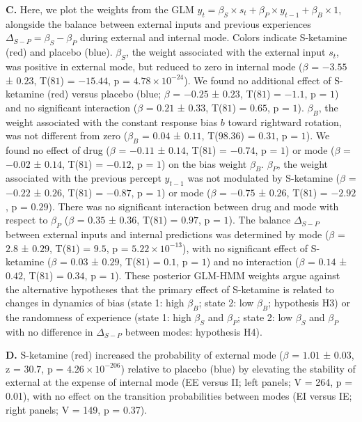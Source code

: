 \documentclass[
]{article}
\begin{document}
\textbf{C.} Here, we plot the weights from the GLM
\(y_t = \beta_S \times s_t + \beta_P \times y_{t-1} + \beta_B \times 1\),
alongside the balance between external inputs and previous experiences
\(\Delta_{S-P} = \beta_S - \beta_P\) during external and internal mode.
Colors indicate S-ketamine (red) and placebo (blue). \(\beta_S\), the
weight associated with the external input \(s_t\), was positive in
external mode, but reduced to zero in internal mode (\(\beta\) =
\(-3.55\) ± \(0.23\), T(\(81\)) = \(-15.44\), p =
\(\ensuremath{4.78\times 10^{-24}}\)). We found no additional effect of
S-ketamine (red) versus placebo (blue; \(\beta\) = \(-0.25\) ± \(0.23\),
T(\(81\)) = \(-1.1\), p = \(1\)) and no significant interaction
(\(\beta\) = \(0.21\) ± \(0.33\), T(\(81\)) = \(0.65\), p = \(1\)).
\(\beta_B\), the weight associated with the constant response bias \(b\)
toward rightward rotation, was not different from zero (\(\beta_B\) =
\(0.04\) ± \(0.11\), T(\(98.36\)) = \(0.31\), p = \(1\)). We found no
effect of drug (\(\beta\) = \(-0.11\) ± \(0.14\), T(\(81\)) = \(-0.74\),
p = \(1\)) or mode (\(\beta\) = \(-0.02\) ± \(0.14\), T(\(81\)) =
\(-0.12\), p = \(1\)) on the bias weight \(\beta_B\). \(\beta_P\), the
weight associated with the previous percept \(y_{t-1}\) was not
modulated by S-ketamine (\(\beta\) = \(-0.22\) ± \(0.26\), T(\(81\)) =
\(-0.87\), p = \(1\)) or mode (\(\beta\) = \(-0.75\) ± \(0.26\),
T(\(81\)) = \(-2.92\), p = \(0.29\)). There was no significant
interaction between drug and mode with respect to \(\beta_P\) (\(\beta\)
= \(0.35\) ± \(0.36\), T(\(81\)) = \(0.97\), p = \(1\)). The balance
\(\Delta_{S-P}\) between external inputs and internal predictions was
determined by mode (\(\beta\) = \(2.8\) ± \(0.29\), T(\(81\)) = \(9.5\),
p = \(\ensuremath{5.22\times 10^{-13}}\)), with no significant effect of
S-ketamine (\(\beta\) = \(0.03\) ± \(0.29\), T(\(81\)) = \(0.1\), p =
\(1\)) and no interaction (\(\beta\) = \(0.14\) ± \(0.42\), T(\(81\)) =
\(0.34\), p = \(1\)). These posterior GLM-HMM weights argue against the
alternative hypotheses that the primary effect of S-ketamine is related
to changes in dynamics of bias (state 1: high \(\beta_B\); state 2: low
\(\beta_B\); hypothesis H3) or the randomness of experience (state 1:
high \(\beta_S\) and \(\beta_P\); state 2: low \(\beta_S\) and
\(\beta_P\) with no difference in \(\Delta_{S-P}\) between modes:
hypothesis H4).

\textbf{D.} S-ketamine (red) increased the probability of external mode
(\(\beta\) = \(1.01\) ± \(0.03\), z = \(30.7\), p =
\(\ensuremath{4.26\times 10^{-206}}\)) relative to placebo (blue) by
elevating the stability of external at the expense of internal mode (EE
versus II; left panels; V = 264, p = 0.01), with no effect on the
transition probabilities between modes (EI versus IE; right panels; V =
149, p = 0.37).
\end{document}
